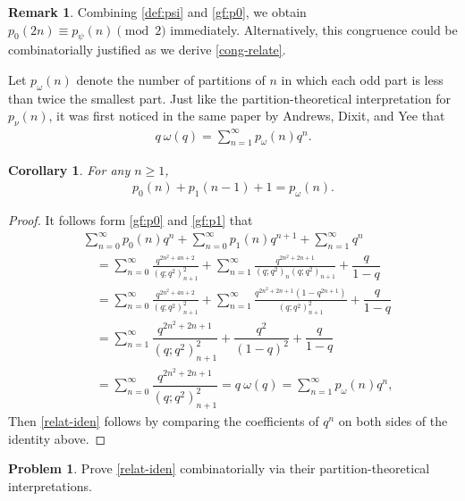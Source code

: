 \documentclass[12pt,reqno]{amsart}
\numberwithin{equation}{section}
\theoremstyle{plain}
\newtheorem{corollary}[theorem]{Corollary}
\theoremstyle{definition}
\newtheorem{remark}[theorem]{Remark}
\newtheorem{?}[theorem]{Problem}
\begin{document}
\begin{remark}
Combining \eqref{def:psi} and \eqref{gf:p0}, we obtain $p_0(2n)\equiv p_\psi(n)\pmod{2}$ immediately.
Alternatively, this congruence could be combinatorially justified as we derive \eqref{cong-relate}.
\end{remark}

Let $p_\omega(n)$ denote the number of partitions of $n$ in which each odd part is less than
twice the smallest part. Just like the partition-theoretical interpretation for $p_{\nu}(n)$, it was first
noticed in the same paper by Andrews, Dixit, and Yee \cite[Theorem~3.1]{ADY} that
\begin{align*}
q\!\:\omega(q)=\sum_{n=1}^{\infty}p_{\omega}(n)q^n.
\end{align*}

\begin{corollary}\label{Cor:relat:mock-theta}
For any $n\geq1$,
\begin{align}
p_0(n)+p_1(n-1)+1=p_\omega(n).\label{relat-iden}
\end{align}
\end{corollary}

\begin{proof}
It follows form \eqref{gf:p0} and \eqref{gf:p1} that
\begin{align*}
 &\sum_{n=0}^\infty p_0(n)q^n+\sum_{n=0}^\infty p_1(n)q^{n+1}+\sum_{n=1}^\infty q^n\\
 &\quad=\sum_{n=0}^\infty\frac{q^{2n^2+4n+2}}{(q;q^2)_{n+1}^2}
+\sum_{n=1}^{\infty}\frac{q^{2n^2+2n+1}}{(q;q^2)_n(q;q^2)_{n+1}}+\dfrac{q}{1-q}\\
 &\quad=\sum_{n=0}^\infty\frac{q^{2n^2+4n+2}}{(q;q^2)_{n+1}^2}+
\sum_{n=1}^{\infty}\frac{q^{2n^2+2n+1}(1-q^{2n+1})}{(q;q^2)_{n+1}^2}+\dfrac{q}{1-q}\\
 &\quad=\sum_{n=1}^\infty\dfrac{q^{2n^2+2n+1}}{(q;q^2)_{n+1}^2}+\dfrac{q^2}{(1-q)^2}+\dfrac{q}{1-q}\\
 &\quad=\sum_{n=0}^\infty\dfrac{q^{2n^2+2n+1}}{(q;q^2)_{n+1}^2}
=q\!\:\omega(q)=\sum_{n=1}^\infty p_\omega(n)q^n,
\end{align*}
Then \eqref{relat-iden} follows by comparing the coefficients of $q^n$ on both sides of the identity above.
\end{proof}

\begin{?}
Prove \eqref{relat-iden} combinatorially via their partition-theoretical interpretations.
\end{?}
\end{document}
